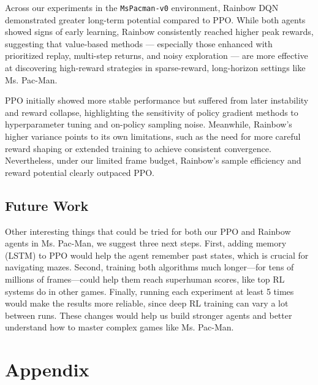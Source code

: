 \documentclass{article}
\begin{document}
Across our experiments in the \texttt{MsPacman-v0} environment, Rainbow DQN demonstrated greater long-term potential compared to PPO. While both agents showed signs of early learning, Rainbow consistently reached higher peak rewards, suggesting that value-based methods — especially those enhanced with prioritized replay, multi-step returns, and noisy exploration — are more effective at discovering high-reward strategies in sparse-reward, long-horizon settings like Ms. Pac-Man.

PPO initially showed more stable performance but suffered from later instability and reward collapse, highlighting the sensitivity of policy gradient methods to hyperparameter tuning and on-policy sampling noise. Meanwhile, Rainbow’s higher variance points to its own limitations, such as the need for more careful reward shaping or extended training to achieve consistent convergence. Nevertheless, under our limited frame budget, Rainbow's sample efficiency and reward potential clearly outpaced PPO.

\subsection{Future Work}
Other interesting things that could be tried for both our PPO and Rainbow agents in Ms. Pac-Man, we suggest three next steps. First, adding memory (LSTM) to PPO would help the agent remember past states, which is crucial for navigating mazes. Second, training both algorithms much longer—for tens of millions of frames—could help them reach superhuman scores, like top RL systems do in other games. Finally, running each experiment at least 5 times would make the results more reliable, since deep RL training can vary a lot between runs. These changes would help us build stronger agents and better understand how to master complex games like Ms. Pac-Man.

\appendix
\section{Appendix}
\label{sec:appendix}
\end{document}
